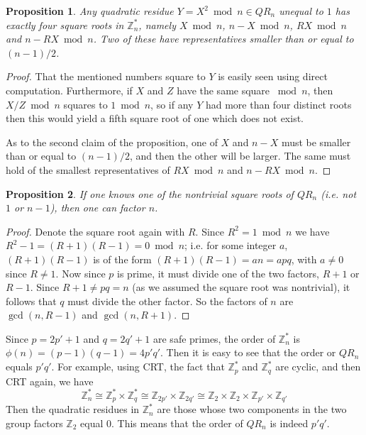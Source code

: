 \documentclass[a4paper,12pt]{article}
\newtheorem{proposition}{Proposition}
\newcommand{\Z}{\mathbb{Z}}
\begin{document}
\begin{proposition}
Any quadratic residue $Y = X^2 \bmod n \in QR_n$ unequal to $1$ has exactly four square roots in $\Z^*_n$, namely $X \bmod n$, $n-X \bmod n$, $RX \bmod n$ and $n-RX \bmod n$. Two of these have representatives smaller than or equal to $(n-1)/2$.
\end{proposition}

\begin{proof}
That the mentioned numbers square to $Y$ is easily seen using direct computation. Furthermore, if $X$ and $Z$ have the same square ${}\bmod n$, then $X/Z \bmod n$ squares to $1 \bmod n$, so if any $Y$ had more than four distinct roots then this would yield a fifth square root of one which does not exist.

As to the second claim of the proposition, one of $X$ and $n-X$ must be smaller than or equal to $(n-1)/2$, and then the other will be larger. The same must hold of the smallest representatives of $RX \bmod n$ and $n-RX \bmod n$.
\end{proof}

\begin{proposition}
If one knows one of the nontrivial square roots of $QR_n$ (i.e. not $1$ or $n-1$), then one can factor $n$.
\end{proposition}

\begin{proof}
Denote the square root again with $R$. Since $R^2 = 1 \bmod n$ we have $R^2 - 1 = (R+1)(R-1) = 0 \bmod n$; i.e. for some integer $a$, $(R+1)(R-1)$ is of the form $(R+1)(R-1) = an = apq$, with $a \neq 0$ since $R \neq 1$. Now since $p$ is prime, it must divide one of the two factors, $R+1$ or $R-1$. Since $R+1 \neq pq = n$ (as we assumed the square root was nontrivial), it follows that $q$ must divide the other factor. So the factors of $n$ are $\gcd(n, R-1)$ and $\gcd(n, R+1)$.
\end{proof}

\noindent Since $p = 2p'+1$ and $q = 2q'+1$ are safe primes, the order of $\Z^*_n$ is $\phi(n) = (p-1)(q-1) = 4p'q'$. Then it is easy to see that the order or $QR_n$ equals $p'q'$. For example, using CRT, the fact that $\Z^*_p$ and $\Z^*_q$ are cyclic, and then CRT again, we have
\[
  \Z^*_n \cong \Z^*_p \times \Z^*_q \cong \Z_{2p'} \times \Z_{2q'} \cong \Z_2 \times \Z_2 \times \Z_{p'} \times \Z_{q'}
\]
Then the quadratic residues in $\Z^*_n$ are those whose two components in the two group factors $\Z_2$ equal $0$. This means that the order of $QR_n$ is indeed $p'q'$.
\end{document}
